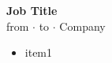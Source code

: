 \documentclass[11pt, a4paper]{article}
\newcommand{\leftsideratio}{0.33} %
\newcommand{\margins}{1.5em} %
\newcommand{\rightsidetextpadding}{3em} %
\renewcommand{\leftsideratio}{%
	0.33%
}
\renewcommand{\margins}{%
	1.5em%
}
\renewcommand{\rightsidetextpadding}{%
	3em%
}
\newcommand{\CVItem}[4]{%
\textbf{#1}\\
{\color{rightsidetext2} #2 $\cdot$ #3 $\cdot$ #4}
}
\begin{document}
{\begin{minipage}[\textheight]{\textwidth-\leftsideratio\textwidth}
\begin{center}
{\begin{minipage}[t][\textheight-\margins]{0.9\textwidth}
    	\bigskip


		\CVItem{%
			Job Title%
		}{%
			from%
		}{%
			to%
		}{%
			Company%
		}


		\begin{itemize}[topsep=2pt, partopsep=0pt, parsep=0pt, itemsep=0pt]
 			\item%
 			item1%
 		\end{itemize}


		\bigskip


    	\vspace{\rightsidetextpadding}


    \end{minipage}
    }
    \end{center}
\end{minipage}
}
\end{document}
